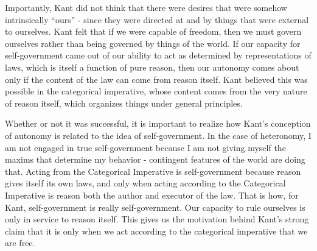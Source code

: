 \documentclass[phd,12pt,oneside,paper=letterpaper]{ubcthesis}
\begin{document}
Importantly, Kant did not think that there were desires that were somehow intrinsically ``ours'' - since they were directed at and by things that were external to ourselves. Kant felt that if we were capable of freedom, then we must govern ourselves rather than being governed by things of the world. If our capacity for self-government came out of our ability to act as determined by representations of laws, which is itself a function of pure reason, then our autonomy comes about only if the content of the law can come from reason itself. Kant believed this was possible in the categorical imperative, whose content comes from the very nature of reason itself, which organizes things under general principles.

Whether or not it was successful, it is important to realize how Kant's conception of autonomy is related to the idea of self-government. In the case of heteronomy, I am not engaged in true self-government because I am not giving myself the maxims that determine my behavior - contingent features of the world are doing that. Acting from the Categorical Imperative is self-government because reason gives itself its own laws, and only when acting according to the Categorical Imperative is reason both the author and executor of the law. That is how, for Kant, self-government is really self-government. Our capacity to rule ourselves is only in service to reason itself. This gives us the motivation behind Kant's strong claim that it is only when we act according to the categorical imperative that we are free. 
\end{document}
